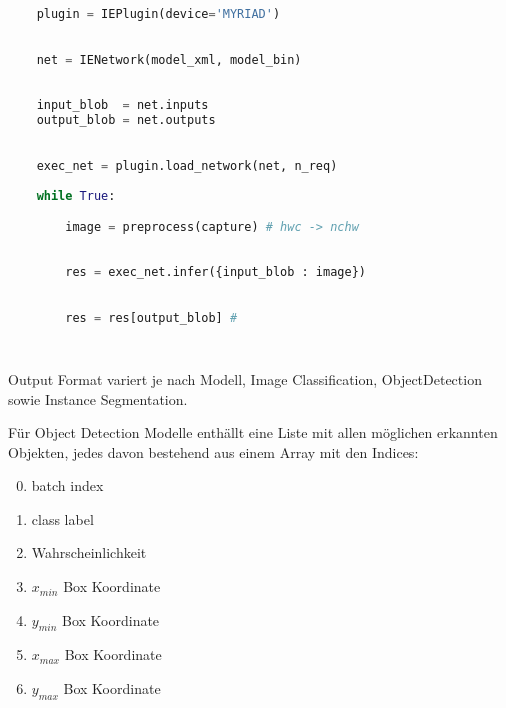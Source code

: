 \begin{minipage}{0.30\textwidth}
    \centering
    
    \label{}
\end{minipage}
\begin{minipage}{0.70\textwidth}

\begin{lstlisting}[language=Python]

    plugin = IEPlugin(device='MYRIAD')

        
    net = IENetwork(model_xml, model_bin)
        
    
    input_blob  = net.inputs
    output_blob = net.outputs
        

    exec_net = plugin.load_network(net, n_req)
        
    while True:

        image = preprocess(capture) # hwc -> nchw
        
        
        res = exec_net.infer({input_blob : image})
        

        res = res[output_blob] #
        
        
\end{lstlisting}
\vspace{1.5cm}
\end{minipage}


Output Format variert je nach Modell, Image Classification,
ObjectDetection sowie Instance Segmentation.


Für Object Detection Modelle 
enthällt eine Liste mit allen möglichen erkannten Objekten, jedes 
davon bestehend aus einem Array mit den Indices:

\begin{enumerate}
    \setcounter{enumi}{-1}
    \item batch index
    \item class label
    \item Wahrscheinlichkeit
    \item $x_{min}$ Box Koordinate
    \item $y_{min}$ Box Koordinate
    \item $x_{max}$ Box Koordinate
    \item $y_{max}$ Box Koordinate
\end{enumerate}


